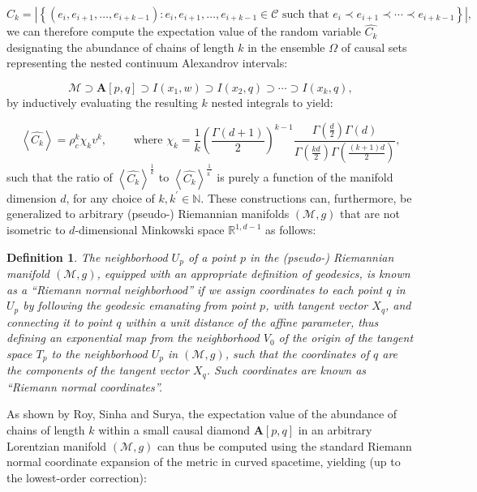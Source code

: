 \documentclass{article}
\newtheorem{definition}{Definition}
\begin{document}
\begin{equation}
C_k = \left\lvert \left\lbrace \left( e_i, e_{i + 1}, \dots, e_{i + k - 1} \right) : e_i, e_{i + 1}, \dots, e_{i + k - 1} \in \mathcal{C} \text{ such that } e_i \prec e_{i + 1} \prec \cdots \prec e_{i + k - 1} \right\rbrace \right\rvert,
\end{equation}
we can therefore compute the expectation value of the random variable ${\hat{C_k}}$ designating the abundance of chains of length $k$ in the ensemble ${\Omega}$ of causal sets representing the nested continuum Alexandrov intervals:

\begin{equation}
\mathcal{M} \supset \mathbf{A} \left[ p, q \right] \supset I \left( x_1, w \right) \supset I \left( x_2, q \right) \supset \cdots \supset I \left( x_k, q \right),
\end{equation}
by inductively evaluating the resulting $k$ nested integrals to yield:

\begin{equation}
\left\langle \hat{C_k} \right\rangle = \rho_{c}^{k} \chi_{k} v^k, \qquad \text{ where } \chi_{k} = \frac{1}{k} \left( \frac{\Gamma \left( d + 1 \right)}{2} \right)^{k - 1} \frac{\Gamma \left( \frac{d}{2} \right) \Gamma \left( d \right)}{\Gamma \left( \frac{k d}{2} \right) \Gamma \left( \frac{\left( k + 1 \right) d}{2} \right)},
\end{equation}
such that the ratio of ${\left\langle \hat{C_k} \right\rangle^{\frac{1}{k}}}$ to ${\left\langle \hat{C_k} \right\rangle^{\frac{1}{k^{\prime}}}}$ is purely a function of the manifold dimension $d$, for any choice of ${k, k^{\prime} \in \mathbb{N}}$. These constructions can, furthermore, be generalized to arbitrary (pseudo-) Riemannian manifolds ${\left( \mathcal{M}, g \right)}$ that are not isometric to $d$-dimensional Minkowski space ${\mathbb{R}^{1, d - 1}}$ as follows:

\begin{definition}
The neighborhood ${U_p}$ of a point $p$ in the (pseudo-) Riemannian manifold ${\left( \mathcal{M}, g \right)}$, equipped with an appropriate definition of geodesics, is known as a ``Riemann normal neighborhood''\cite{kobayashi} if we assign coordinates to each point $q$ in ${U_p}$ by following the geodesic emanating from point $p$, with tangent vector ${X_q}$, and connecting it to point $q$ within a unit distance of the affine parameter, thus defining an exponential map from the neighborhood ${V_0}$ of the origin of the tangent space ${T_p}$ to the neighborhood ${U_p}$ in ${\left( \mathcal{M}, g \right)}$, such that the coordinates of $q$ are the components of the tangent vector ${X_q}$. Such coordinates are known as ``Riemann normal coordinates''.
\end{definition}
As shown by Roy, Sinha and Surya\cite{roy}, the expectation value of the abundance of chains of length $k$ within a small causal diamond ${\mathbf{A} \left[ p, q \right]}$ in an arbitrary Lorentzian manifold ${\left( \mathcal{M}, g \right)}$ can thus be computed using the standard Riemann normal coordinate expansion of the metric in curved spacetime\cite{khetrapal}, yielding (up to the lowest-order correction):
\end{document}
